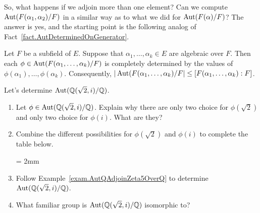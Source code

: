 So, what happens if we adjoin more than one element? Can we compute $\operatorname{Aut}(F(\alpha_1,\alpha_2)/F)$ in a similar way as to what we did for $\operatorname{Aut}(F(\alpha)/F)$? The answer is yes, and the starting point is the following analog of Fact~\ref{fact.AutDeterminedOnGenerator}.

\begin{fact}
Let $F$ be a subfield of $E$. Suppose that $\alpha_1,\ldots,\alpha_k\in E$ are algebraic over $F$. Then each $\phi\in \operatorname{Aut}({F}(\alpha_1,\ldots,\alpha_k)/F)$ is completely determined by the values of $\phi(\alpha_1),\ldots,\phi(\alpha_k)$. Consequently,  $|\operatorname{Aut}({F}(\alpha_1,\ldots,\alpha_k)/F|\le  [F(\alpha_1,\ldots,\alpha_k):F]$.
\end{fact}

\begin{problem}\label{prob.AutQAdjoinSqrt2AndiOverQ}
Let's determine $\operatorname{Aut}(\mathbb{Q}(\sqrt{2},i)/\mathbb{Q})$.
\begin{enumerate}
\item Let $\phi\in  \operatorname{Aut}(\mathbb{Q}(\sqrt{2},i)/\mathbb{Q})$. Explain why there are only two choice for $\phi(\sqrt{2})$ and only two choice for $\phi(i)$. What are they?
\item Combine the different possibilities for $\phi(\sqrt{2})$ and $\phi(i)$ to complete the table below.
\begin{center}
\tabulinesep = 2mm
\end{center}
\item Follow Example~\ref{exam.AutQAdjoinZeta5OverQ} to determine $\operatorname{Aut}(\mathbb{Q}(\sqrt{2},i)/\mathbb{Q})$.
\item What familiar group is  $\operatorname{Aut}(\mathbb{Q}(\sqrt{2},i)/\mathbb{Q})$ isomorphic to?
\end{enumerate}
\end{problem}

